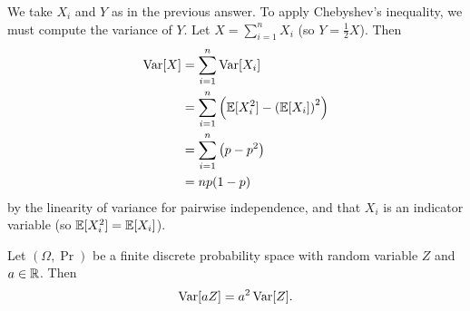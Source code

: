 \subpart\hspace{0em}
\begin{solution}
    We take $X_i$ and $Y$ as in the previous answer. To apply Chebyshev's inequality, we must compute the variance of $Y$. Let $X = \sum_{i=1}^n X_i$ (so $Y = \tfrac12 X$). Then
    \begin{align*}
        \operatorname{Var}[X] & = \sum_{i=1}^n \operatorname{Var}[X_i]                                       \\
                & = \sum_{i=1}^n \left(\mathbb E[X_i^2] - \left(\mathbb E[X_i]\right)^2\right) \\
                & = \sum_{i=1}^n \left(p - p^2\right)                            \\
                & = np(1 - p)
    \end{align*}
    by the linearity of variance for pairwise independence, and that $X_i$ is an indicator variable (so $\mathbb E[X_i^2] = \mathbb E[X_i]$).

    \vspace{0.5em}
    \begin{lemma}
        Let $(\Omega, \Pr)$ be a finite discrete probability space with random variable $Z$ and $a \in \mathbb R$. Then
        \[ \operatorname{Var}[aZ] = a^2\operatorname{Var}[Z]. \]
    \end{lemma}


\end{solution}
